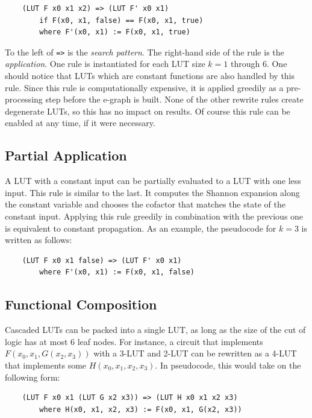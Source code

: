 \begin{verbatim}
    (LUT F x0 x1 x2) => (LUT F' x0 x1)
        if F(x0, x1, false) == F(x0, x1, true)
        where F'(x0, x1) := F(x0, x1, true)
\end{verbatim}

To the left of \texttt{=>} is the \textit{search pattern}. The right-hand side
of the rule is the \textit{application}. One rule is instantiated for each LUT
size $k =1$ through 6. One should notice that LUTs which are constant functions
are also handled by this rule. Since this rule is computationally expensive, it
is applied greedily as a pre-processing step before the e-graph is built. None
of the other rewrite rules create degenerate LUTs, so this has no impact on
results. Of course this rule can be enabled at any time, if it were necessary.

\subsection{Partial Application}\label{sec:rewrites:application}
A LUT with a constant input can be partially evaluated to a LUT with one less
input. This rule is similar to the last. It computes the Shannon expansion
along the constant variable and chooses the cofactor that matches the state of
the constant input. Applying this rule greedily in combination with the
previous one is equivalent to constant propagation. As an example, the
pseudocode for $k=3$ is written as follows:

\begin{verbatim}
    (LUT F x0 x1 false) => (LUT F' x0 x1)
        where F'(x0, x1) := F(x0, x1, false)
\end{verbatim}

\subsection{Functional Composition}\label{sec:rewrites:composition}

Cascaded LUTs can be packed into a single LUT, as long as the size of the cut
of logic has at most 6 leaf nodes. For instance, a circuit that implements
$F(x_0, x_1, G(x_2, x_3))$ with a 3-LUT and 2-LUT can be rewritten as a 4-LUT
that implements some $H(x_0, x_1, x_2, x_3)$. In pseudocode, this would take on
the following form:
\begin{verbatim}
    (LUT F x0 x1 (LUT G x2 x3)) => (LUT H x0 x1 x2 x3)
        where H(x0, x1, x2, x3) := F(x0, x1, G(x2, x3))
\end{verbatim}

